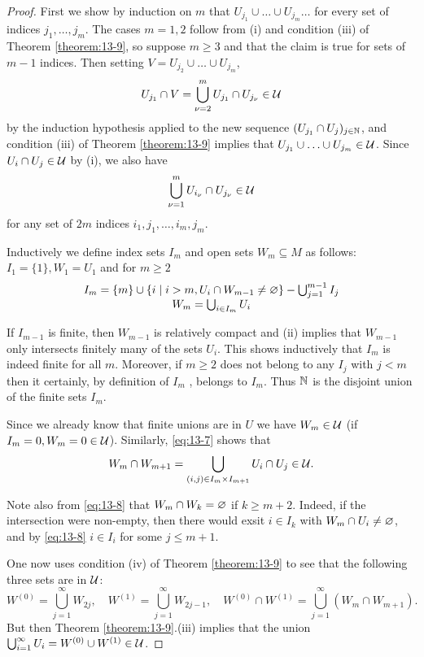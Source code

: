 \begin{proof}
  First we show by induction on $m$ that $U_{j_1}\cup\ldots\cup U_{j_m}\ldots$ for every set
  of indices $j_1, \ldots, j_m$. The cases $m = 1,2$ follow from (i) and condition (iii) of
  Theorem \ref{theorem:13-9}, so suppose $m\ge 3$ and that the claim is true for sets of $m - 1$
  indices. Then setting $V = U_{j_2}\cup\ldots\cup U_{j_m}$,
  \[
    U_{j_1}\cap V = \bigcup_{\nu=2}^m U_{j_1}\cap U_{j_\nu}\in\mathcal{U}
  \]
  by the induction hypothesis applied to the new sequence $(U_{j_1}\cap U_{j})_{j\in{\ensuremath{\mathbb{N}}}}$, and
  condition (iii) of Theorem \ref{theorem:13-9} implies that $U_{j_1}\cup\ldots\cup U_{j_m}\in\mathcal{U}$. 
  Since $U_i\cap U_j\in\mathcal{U}$ by (i), we also have
  \begin{align}\label{eq:13-7}
    \bigcup_{\nu=1}^m U_{i_\nu}\cap U_{j_\nu}\in\mathcal{U}
  \end{align}
  for any set of $2m$ indices $i_1, j_1,\ldots, i_m, j_m$.

  Inductively we define index sets $I_m$ and open sets $W_m\subseteq M$ as follows: $I_1=\{1\}, W_1=U_1$ and 
  for $m\ge 2$
  \begin{align}\label{eq:13-8}
    \begin{matrix}
      I_m = \{m\} \cup \{i\mid i>m, U_i\cap W_{m-1}\neq\varnothing\} - \bigcup_{j=1}^{m-1} I_j \\
      W_m = \bigcup_{i\in I_m} U_i
    \end{matrix}
  \end{align}
  
  If $I_{m-1}$ is finite, then $W_{m-1}$ is relatively compact and (ii) implies that $W_{m-1}$
  only intersects finitely many of the sets $U_i$. This shows inductively that $I_m$ is
  indeed finite for all $m$. Moreover, if $m\ge 2$ does not belong to any $I_j$ with $j < m$
  then it certainly, by definition of $I_m$ , belongs to $I_m$. Thus ${\mathbb{N}}$ is the disjoint union
  of the finite sets $I_m$.

  Since we already know that finite unions are in $U$ we have $W_m\in\mathcal{U}$ (if $I_m=0, W_m=0\in\mathcal{U}$). 
  Similarly, \eqref{eq:13-7} shows that
  \[
    W_m\cap W_{m+1} = \bigcup_{(i, j)\in I_m\times I_{m+1}} U_i\cap U_j\in\mathcal{U}.
  \]

  Note also from \eqref{eq:13-8} that $W_m\cap W_k=\varnothing$ if $k\ge m+2$. Indeed, if the intersection 
  were non-empty, then there would exsit $i\in I_k$ with $W_m\cap U_i\neq\varnothing$, and by \eqref{eq:13-8}
  $i\in I_i$ for some $j\le m+1$.

  One now uses condition (iv) of Theorem \ref{theorem:13-9} to see that the following three sets are in $\mathcal{U}$:
  \[
    W^{(0)} = \bigcup_{j=1}^\infty W_{2j},\quad
    W^{(1)} = \bigcup_{j=1}^\infty W_{2j-1},\quad
    W^{(0)}\cap W^{(1)} = \bigcup_{j=1}^\infty (W_m\cap W_{m+1}).
  \]
  But then Theorem \ref{theorem:13-9}.(iii) implies that the union $\bigcup_{i=1}^\infty U_i=W^{(0)}\cup W^{(1)}\in\mathcal{U}$.
\end{proof}

